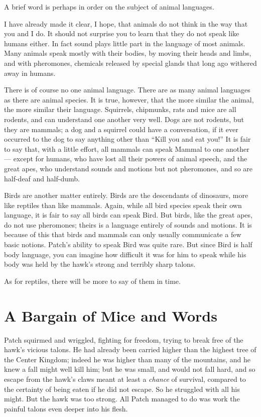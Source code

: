 \documentclass[ebook,oneside,openany,17pt]{memoir}
\renewcommand{\thechapter}{\Roman{chapter}}
\newcounter{sections}
\newcommand{\sections}[1]{%
  \section*{#1}
  \addtocounter{sections}{1}%
  \pdfbookmark[1]{#1}{section.\thechapter.\thesections}}
\begin{document}
A brief word is perhaps in order on the subject of animal languages.

I have already made it clear, I hope, that animals do not think in the
way that you and I do. It should not surprise you to learn that they
do not speak like humans either. In fact sound plays little part in
the language of most animals. Many animals speak mostly with their
bodies, by moving their heads and limbs, and with pheromones,
chemicals released by special glands that long ago withered away in
humans.

There is of course no one animal language. There are as many animal
languages as there are animal species. It is true, however, that the
more similar the animal, the more similar their language. Squirrels,
chipmunks, rats and mice are all rodents, and can understand one
another very well. Dogs are not rodents, but they are mammals; a dog
and a squirrel could have a conversation, if it ever occurred to the
dog to say anything other than “Kill you and eat you!” It is fair to
say that, with a little effort, all mammals can speak Mammal to one
another — except for humans, who have lost all their powers of animal
speech, and the great apes, who understand sounds and motions but not
pheromones, and so are half-deaf and half-dumb.

Birds are another matter entirely. Birds are the descendants of
dinosaurs, more like reptiles than like mammals. Again, while all bird
species speak their own language, it is fair to say all birds can
speak Bird. But birds, like the great apes, do not use pheromones;
theirs is a language entirely of sounds and motions. It is because of
this that birds and mammals can only usually communicate a few basic
notions. Patch’s ability to speak Bird was quite rare. But since Bird
is half body language, you can imagine how difficult it was for him to
speak while his body was held by the hawk’s strong and terribly sharp
talons.

As for reptiles, there will be more to say of them in time.


\sections{A Bargain of Mice and Words}

Patch squirmed and wriggled, fighting for freedom, trying to break
free of the hawk’s vicious talons. He had already been carried higher
than the highest tree of the Center Kingdom; indeed he was higher than
many of the mountains, and he knew a fall might well kill him; but he
was small, and would not fall hard, and so escape from the hawk’s
claws meant at least a \emph{chance} of survival, compared to the
certainty of being eaten if he did not escape. So he struggled with
all his might. But the hawk was too strong. All Patch managed to do
was work the painful talons even deeper into his flesh.
\end{document}
